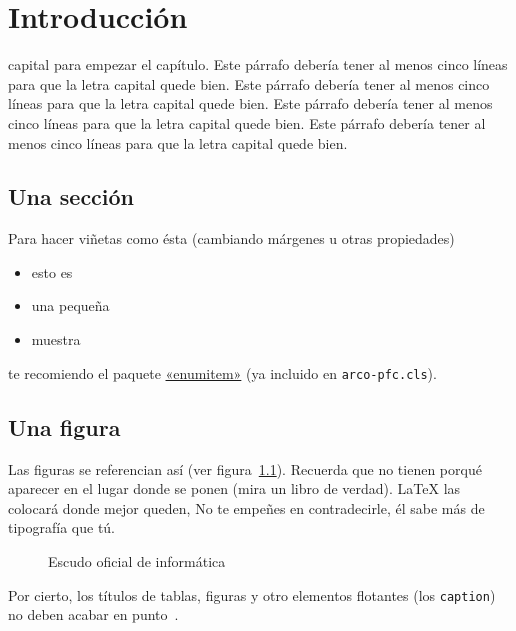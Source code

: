 
\chapter{Introducción}

 capital para empezar el capítulo. Este párrafo debería tener al menos cinco
líneas para que la letra capital quede bien. Este párrafo debería tener al menos cinco
líneas para que la letra capital quede bien. Este párrafo debería tener al menos cinco
líneas para que la letra capital quede bien. Este párrafo debería tener al menos cinco
líneas para que la letra capital quede bien.


\section{Una sección}

Para hacer viñetas como ésta (cambiando márgenes u otras propiedades)

\begin{itemize}[noitemsep, label=$\triangleright$]
\item esto es
\item una pequeña
\item muestra
\end{itemize}

te recomiendo el paquete
\href{http://mirror.ctan.org/macros/latex/contrib/enumitem/enumitem.pdf}{«enumitem»}
(ya incluido en \texttt{arco-pfc.cls}).


\section{Una figura}

Las figuras se referencian así (ver figura~\ref{fig:informatica}). Recuerda que
no tienen porqué aparecer en el lugar donde se ponen (mira un libro de
verdad). \LaTeX{} las colocará donde mejor queden, No te empeñes en
contradecirle, él sabe más de tipografía que tú.

\begin{figure}[!h]
\begin{center}
\caption{Escudo oficial de informática}
\label{fig:informatica}
\end{center}
\end{figure}

Por cierto, los títulos de tablas, figuras y otro elementos flotantes (los
\texttt{caption}) no deben acabar en punto~\cite{Sousa08}.


